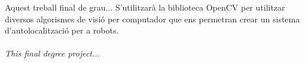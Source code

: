 	Aquest treball final de grau... S'utilitzarà la biblioteca OpenCV per utilitzar diversos algorismes de visió per computador que ens permetran crear un sistema d'autolocalització per a robots.\\\\
	\textit{This final degree project...}
